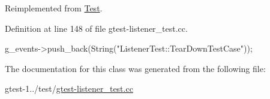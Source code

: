 \-Reimplemented from \hyperlink{classtesting_1_1Test_aaff0dc66f57f643a49ad3dd6bcb56916}{\-Test}.



\-Definition at line 148 of file gtest-\/listener\-\_\-test.\-cc.


\begin{DoxyCode}
                                 {
    g_events->push_back(String("ListenerTest::TearDownTestCase"));
  }
\end{DoxyCode}


\-The documentation for this class was generated from the following file\-:\begin{DoxyCompactItemize}
\item 
gtest-\/1../test/\hyperlink{gtest-listener__test_8cc}{gtest-\/listener\-\_\-test.\-cc}\end{DoxyCompactItemize}
